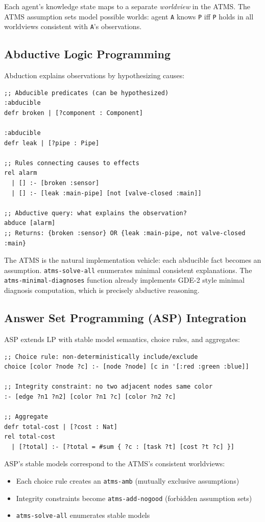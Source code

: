 \documentclass[11pt]{article}
\begin{document}
Each agent's knowledge state maps to a separate \emph{worldview} in the ATMS.
The ATMS assumption sets model possible worlds: agent \texttt{A} knows \texttt{P} iff
\texttt{P} holds in all worldviews consistent with \texttt{A}'s observations.
\subsection{Abductive Logic Programming}
\label{sec:org3a4a238}

Abduction explains observations by hypothesizing causes:

\begin{verbatim}
;; Abducible predicates (can be hypothesized)
:abducible
defr broken | [?component : Component]

:abducible
defr leak | [?pipe : Pipe]

;; Rules connecting causes to effects
rel alarm
  | [] :- [broken :sensor]
  | [] :- [leak :main-pipe] [not [valve-closed :main]]

;; Abductive query: what explains the observation?
abduce [alarm]
;; Returns: {broken :sensor} OR {leak :main-pipe, not valve-closed :main}
\end{verbatim}

The ATMS is the natural implementation vehicle: each abducible fact becomes
an assumption. \texttt{atms-solve-all} enumerates minimal consistent explanations.
The \texttt{atms-minimal-diagnoses} function already implements GDE-2 style
minimal diagnosis computation, which is precisely abductive reasoning.
\subsection{Answer Set Programming (ASP) Integration}
\label{sec:org4b03321}

ASP extends LP with stable model semantics, choice rules, and aggregates:

\begin{verbatim}
;; Choice rule: non-deterministically include/exclude
choice [color ?node ?c] :- [node ?node] [c in '[:red :green :blue]]

;; Integrity constraint: no two adjacent nodes same color
:- [edge ?n1 ?n2] [color ?n1 ?c] [color ?n2 ?c]

;; Aggregate
defr total-cost | [?cost : Nat]
rel total-cost
  | [?total] :- [?total = #sum { ?c : [task ?t] [cost ?t ?c] }]
\end{verbatim}

ASP's stable models correspond to the ATMS's consistent worldviews:
\begin{itemize}
\item Each choice rule creates an \texttt{atms-amb} (mutually exclusive assumptions)
\item Integrity constraints become \texttt{atms-add-nogood} (forbidden assumption sets)
\item \texttt{atms-solve-all} enumerates stable models
\end{itemize}
\end{document}
